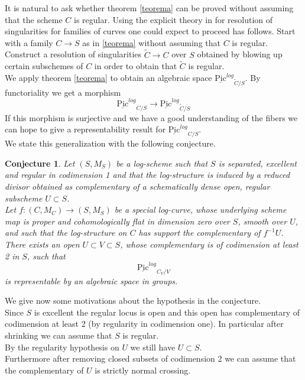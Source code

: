 \documentclass{amsart}
\newtheorem{conj}{Conjecture}
\theoremstyle{definition}
\numberwithin{equation}{section}
\begin{document}
\noindent It is natural to ask whether theorem \ref{teorema} can be proved without assuming that the scheme $C$ is regular. Using the explicit theory in \cite{alter} for resolution of singularities for families of curves one could expect to proceed has follows. Start with a family $C{\rightarrow} S$ as in \ref{teorema} without assuming that $C$ is regular. Construct a resolution of singularities $\tilde{C}{\rightarrow} C$ over $S$ obtained by blowing up certain subschemes of $C$ in order to obtain that $\tilde{C}$ is regular.\\
We apply theorem \ref{teorema} to obtain an algebraic space ${\underline{\mbox{Pic}}^{log}}_{\tilde{C}/S}$. By functoriality we get a morphism
$$
{\underline{\mbox{Pic}}^{log}}_{C/S}{\rightarrow} {\underline{\mbox{Pic}}^{log}}_{\tilde{C}/S}
$$
\noindent If this morphism is surjective and we have a good understanding of the fibers we can hope to give a representability result for ${\underline{\mbox{Pic}}^{log}}_{C/S}$.\\
We state this generalization with the following conjecture.
\begin{conj}
Let $(S,M_S)$ be a log-scheme such that $S$ is separated, excellent and regular in codimension 1 and that the log-structure is induced by a reduced divisor obtained as complementary of a schematically dense open, regular subscheme $U\subset S$.\\
Let $f:(C,M_C){\rightarrow} (S,M_S)$ be a special log-curve, whose underlying scheme map is proper and cohomologically flat in dimension zero over $S$, smooth over $U$, and such that the log-structure on $C$ has support the complementary of $f^{-1}U$.\\
There exists an open $U\subset V\subset S$, whose complementary is of codimension at least 2 in $S$, such that
$$
{\underline{\mbox{Pic}}^{log}}_{C_V/V}
$$
\noindent is representable by an algebraic space in groups.
\end{conj}
We give now some motivations about the hypothesis in the conjecture.\\
Since $S$ is excellent the regular locus is open and this open has complementary of codimension at least 2 (by regularity in codimension one).
In particular after shrinking we can assume that $S$ is regular.\\ By the regularity hypothesis on $U$ we still have $U\subset S$.\\
Furthermore after removing closed subsets of codimension 2 we can assume that the complementary of $U$ is strictly normal crossing.\\ 
\end{document}

